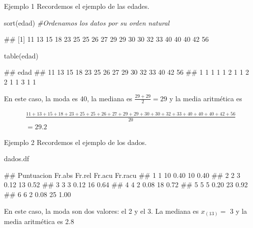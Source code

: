 \documentclass[
  ignorenonframetext,
  aspectratio=169]{beamer}
\newenvironment{Shaded}{\begin{snugshade}}{\end{snugshade}}
\newcommand{\CommentTok}[1]{\textcolor[rgb]{0.56,0.35,0.01}{\textit{#1}}}
\newcommand{\FunctionTok}[1]{\textcolor[rgb]{0.00,0.00,0.00}{#1}}
\newcommand{\NormalTok}[1]{#1}
\let\oldverbatim\verbatim
\let\endoldverbatim\endverbatim
\renewenvironment{verbatim}{\tiny\oldverbatim}{\endoldverbatim}
\begin{document}
\begin{frame}[fragile]{Ejemplo 1}
\protect\hypertarget{ejemplo-1-7}{}
Recordemos el ejemplo de las edades.

\begin{Shaded}
\begin{Highlighting}[]
\FunctionTok{sort}\NormalTok{(edad) }\CommentTok{\#Ordenamos los datos por su orden natural}
\end{Highlighting}
\end{Shaded}

\begin{verbatim}
##  [1] 11 13 15 18 23 25 25 26 27 29 29 30 30 32 33 40 40 40 42 56
\end{verbatim}

\begin{Shaded}
\begin{Highlighting}[]
\FunctionTok{table}\NormalTok{(edad)}
\end{Highlighting}
\end{Shaded}

\begin{verbatim}
## edad
## 11 13 15 18 23 25 26 27 29 30 32 33 40 42 56 
##  1  1  1  1  1  2  1  1  2  2  1  1  3  1  1
\end{verbatim}

En este caso, la moda es 40, la mediana es \(\frac{29+29}{2}=29\) y la
media aritmética es

\begin{align*}
& \frac{11+13+15+18+23+25+25+26+27+29+29+30+30+32+33+40+40+40+42+56}{20}  \\  &= 29.2
\end{align*}
\end{frame}

\begin{frame}[fragile]{Ejemplo 2}
\protect\hypertarget{ejemplo-2-6}{}
Recordemos el ejemplo de los dados.

\begin{Shaded}
\begin{Highlighting}[]
\NormalTok{dados.df}
\end{Highlighting}
\end{Shaded}

\begin{verbatim}
##   Puntuacion Fr.abs Fr.rel Fr.acu Fr.racu
## 1          1     10   0.40     10    0.40
## 2          2      3   0.12     13    0.52
## 3          3      3   0.12     16    0.64
## 4          4      2   0.08     18    0.72
## 5          5      5   0.20     23    0.92
## 6          6      2   0.08     25    1.00
\end{verbatim}

En este caso, la moda son dos valores: el 2 y el 3. La mediana es
\(x_{(13)}=\) 3 y la media aritmética es 2.8
\end{frame}
\end{document}
